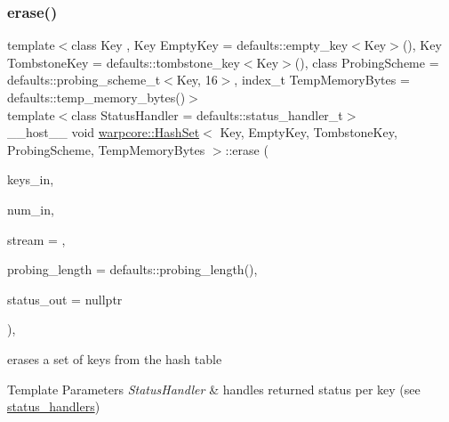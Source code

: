 \subsubsection{\texorpdfstring{erase()}{erase()}\hspace{0.1cm}{\footnotesize\ttfamily [2/2]}}
{\footnotesize\ttfamily template$<$class Key , Key Empty\+Key = defaults\+::empty\+\_\+key$<$\+Key$>$(), Key Tombstone\+Key = defaults\+::tombstone\+\_\+key$<$\+Key$>$(), class Probing\+Scheme  = defaults\+::probing\+\_\+scheme\+\_\+t$<$\+Key, 16$>$, index\+\_\+t Temp\+Memory\+Bytes = defaults\+::temp\+\_\+memory\+\_\+bytes()$>$ \\
template$<$class Status\+Handler  = defaults\+::status\+\_\+handler\+\_\+t$>$ \\
\+\_\+\+\_\+host\+\_\+\+\_\+ void \hyperlink{classwarpcore_1_1HashSet}{warpcore\+::\+Hash\+Set}$<$ Key, Empty\+Key, Tombstone\+Key, Probing\+Scheme, Temp\+Memory\+Bytes $>$\+::erase (\begin{DoxyParamCaption}\item[{key\+\_\+type $\ast$}]{keys\+\_\+in,  }\item[{index\+\_\+type}]{num\+\_\+in,  }\item[{cuda\+Stream\+\_\+t}]{stream = {},  }\item[{index\+\_\+type}]{probing\+\_\+length = {\ttfamily defaults\+:\+:probing\+\_\+length()},  }\item[{typename Status\+Handler\+::base\+\_\+type $\ast$}]{status\+\_\+out = {\ttfamily nullptr} }\end{DoxyParamCaption})\hspace{0.3cm}{\ttfamily [inline]}, {\ttfamily [noexcept]}}



erases a set of keys from the hash table 


\begin{DoxyTemplParams}{Template Parameters}
{\em Status\+Handler} & handles returned status per key (see {\ttfamily \hyperlink{namespacewarpcore_1_1status__handlers}{status\+\_\+handlers}}) \\
\hline
\end{DoxyTemplParams}

